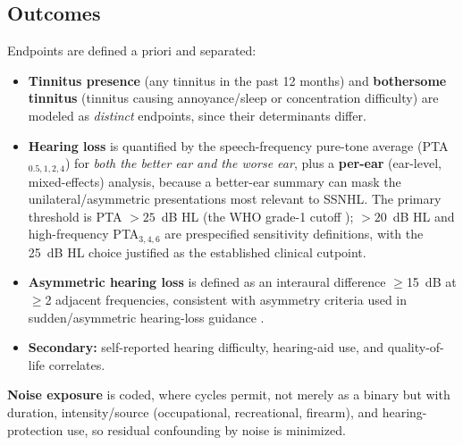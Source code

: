 \subsection{Outcomes}
Endpoints are defined a priori and separated:
\begin{itemize}[leftmargin=1.4em,itemsep=1pt]
\item \textbf{Tinnitus presence} (any tinnitus in the past 12 months) and \textbf{bothersome tinnitus} (tinnitus causing annoyance/sleep or concentration difficulty) are modeled as \emph{distinct} endpoints, since their determinants differ.
\item \textbf{Hearing loss} is quantified by the speech-frequency pure-tone average (PTA$_{0.5,1,2,4}$) for \emph{both the better ear and the worse ear}, plus a \textbf{per-ear} (ear-level, mixed-effects) analysis, because a better-ear summary can mask the unilateral/asymmetric presentations most relevant to SSNHL. The primary threshold is PTA $>25$~dB HL (the WHO grade-1 cutoff \citep{who2021world}); $>20$~dB HL and high-frequency PTA$_{3,4,6}$ are prespecified sensitivity definitions, with the 25~dB HL choice justified as the established clinical cutpoint.
\item \textbf{Asymmetric hearing loss} is defined as an interaural difference $\geq$15~dB at $\geq$2 adjacent frequencies, consistent with asymmetry criteria used in sudden/asymmetric hearing-loss guidance \citep{chandrasekhar2019ssnhl}.
\item \textbf{Secondary:} self-reported hearing difficulty, hearing-aid use, and quality-of-life correlates.
\end{itemize}
\textbf{Noise exposure} is coded, where cycles permit, not merely as a binary but with duration, intensity/source (occupational, recreational, firearm), and hearing-protection use, so residual confounding by noise is minimized.

